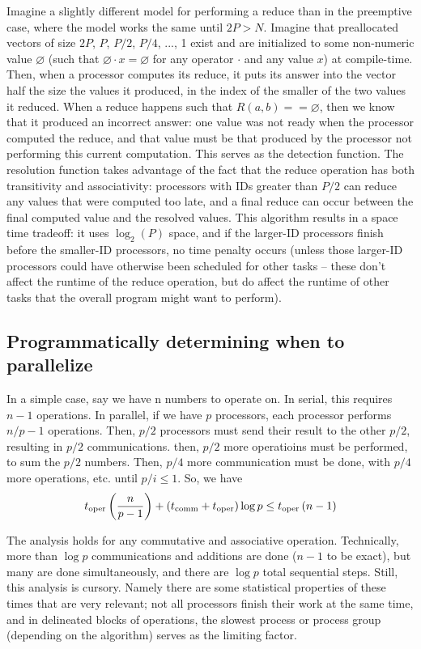 Imagine a slightly different model for performing a reduce than in the
preemptive case, where the model works the same until $2P > N$. Imagine that
preallocated vectors of size $2P$, $P$, $P/2$, $P/4$, ..., 1 exist and are
initialized to some non-numeric value $\varnothing$ (such that $\varnothing
\cdot x = \varnothing$ for any operator $\cdot$ and any value $x$) at
compile-time. Then, when a processor computes its reduce, it puts its answer
into the vector half the size the values it produced, in the index of the
smaller of the two values it reduced. When a reduce happens such that $R(a,b) ==
\varnothing$, then we know that it produced an incorrect answer: one value was
not ready when the processor computed the reduce, and that value must be that
produced by the processor not performing this current computation. This serves
as the detection function. The resolution function takes advantage of the fact
that the reduce operation has both transitivity and associativity: processors
with IDs greater than $P/2$ can reduce any values that were computed too late,
and a final reduce can occur between the final computed value and the resolved
values. This algorithm results in a space time tradeoff: it uses $\log_2(P)$
space, and if the larger-ID processors finish before the smaller-ID processors,
no time penalty occurs (unless those larger-ID processors could have otherwise
been scheduled for other tasks -- these don't affect the runtime of the reduce
operation, but do affect the runtime of other tasks that the overall program
might want to perform).

\subsection{Programmatically determining when to parallelize}
In a simple case, say we have n numbers to operate on. In serial, this requires $n-1$
operations. In parallel, if we have $p$ processors, each processor performs
$n/p - 1$ operations. Then, $p/2$ processors must send their result to the other
$p/2$, resulting in $p/2$ communications. then, $p/2$ more operatioins must be
performed, to sum the $p/2$ numbers. Then, $p/4$ more communication must be done,
with $p/4$ more operations, etc. until $p/i \leq 1$. So, we have
\begin{align*}
t_\mathrm{oper}\left(\frac{n}{p-1}\right) + \left(t_\mathrm{comm} + t_\mathrm{oper}\right)\log{p} \leq t_\mathrm{oper}\left(n-1\right)
\end{align*}

The analysis holds for any commutative and associative operation. Technically,
more than $\log{p}$ communications and additions are done ($n-1$ to be exact),
but many are done simultaneously, and there are $\log{p}$ total sequential
steps. Still, this analysis is cursory. Namely there are some statistical
properties of these times that are very relevant; not all processors finish
their work at the same time, and in delineated blocks of operations, the slowest
process or process group (depending on the algorithm) serves as the limiting
factor.

